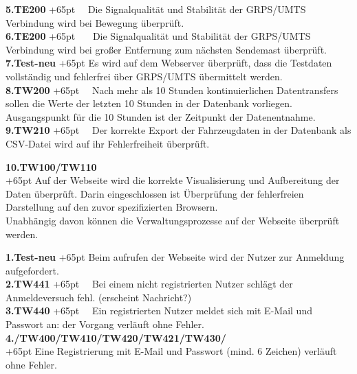 \documentclass[fontsize = 12pt, paper = a4]{scrreprt}
\begin{document}
\textbf{5.TE200}
\hangindent+65pt  
\ \ Die Signalqualität und Stabilität der GRPS/UMTS Verbindung wird bei Bewegung überprüft.\\

\textbf{6.TE200}
\hangindent+65pt  
\ \ \  Die Signalqualität und Stabilität der GRPS/UMTS Verbindung wird bei großer Entfernung zum nächsten Sendemast überprüft.\\

\textbf{7.Test-neu}
\hangindent+65pt 
 Es wird auf dem Webserver überprüft, dass die Testdaten vollständig und fehlerfrei über GRPS/UMTS übermittelt werden.\\
 
\textbf{8.TW200}
\hangindent+65pt 
\ \  Nach mehr als 10 Stunden kontinuierlichen Datentransfers sollen die Werte der letzten 10 Stunden in der Datenbank vorliegen. Ausgangspunkt für die 10 Stunden ist der Zeitpunkt der Datenentnahme.\\
 
\textbf{9.TW210}
\hangindent+65pt 
\ \ Der korrekte Export der Fahrzeugdaten in der Datenbank als CSV-Datei wird auf ihr Fehlerfreiheit überprüft.\\

\newpage

\textbf{10.TW100/TW110}\\
\hangindent+65pt 
Auf der Webseite wird die korrekte Visualisierung und Aufbereitung der Daten überprüft. Darin eingeschlossen ist Überprüfung der fehlerfreien Darstellung auf den zuvor spezifizierten Browsern. \\




Unabhängig davon können die Verwaltungsprozesse auf der Webseite überprüft werden.


\textbf{1.Test-neu}
\hangindent+65pt 
Beim aufrufen der Webseite wird der Nutzer zur Anmeldung aufgefordert.\\

\textbf{2.TW441}
\hangindent+65pt 
\ \ Bei einem nicht registrierten Nutzer schlägt der Anmeldeversuch fehl. (erscheint Nachricht?)\\
 
\textbf{3.TW440}
\hangindent+65pt 
\ \ Ein registrierten Nutzer meldet sich mit E-Mail und Passwort an: der Vorgang verläuft ohne Fehler.\\
 
\textbf{4./TW400/TW410/TW420/TW421/TW430/}\\
\hangindent+65pt 
Eine Registrierung mit E-Mail und Passwort (mind. 6 Zeichen) verläuft ohne Fehler.\\
\end{document}
